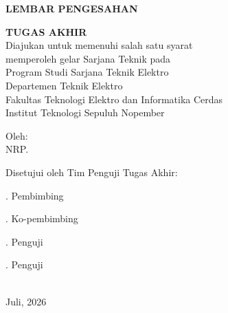 \begin{center}
  \large
  \textbf{LEMBAR PENGESAHAN}
\end{center}

\thispagestyle{empty}

\begin{center}
  \textbf{\tatitle{}}
\end{center}

\begingroup
\small

\begin{center}
  \textbf{TUGAS AKHIR}
  \\Diajukan untuk memenuhi salah satu syarat \\
  memperoleh gelar Sarjana Teknik pada \\
  Program Studi Sarjana Teknik Elektro \\
  Departemen Teknik Elektro \\
  Fakultas Teknologi Elektro dan Informatika Cerdas \\
  Institut Teknologi Sepuluh Nopember
\end{center}

\vspace{3ex}

\begin{center}
  Oleh: \textbf{\MakeUppercase{\name{}}}
  \\NRP. \nrp{}
\end{center}

\vspace{3ex}

\begin{center}
  Disetujui oleh Tim Penguji Tugas Akhir:
\end{center}

\vspace{2ex}

. \advisor{} \hfill Pembimbing

\vspace{2ex}
. \coadvisor{} \hfill Ko-pembimbing

\vspace{2ex}
. \examinerone{} \hfill Penguji

\vspace{2ex}
. \examinertwo{} \hfill Penguji

\vspace{6ex}

\begin{center}
  \textbf{\MakeUppercase{\place{}}}
  \\Juli, 2026
\end{center}
\endgroup
